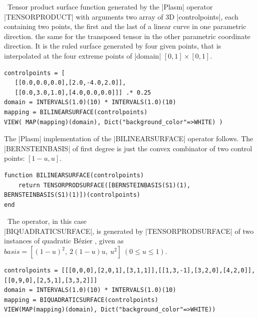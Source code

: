 \begin{coding}[Algebraic computation of FE = $\delta_1$]
\begin{condition}\
Tensor product surface function generated by the |Plasm| operator |TENSORPRODUCT| with arguments two array of 3D |controlpoints|, each containing two points, the first and the last of a linear curve in one parametric direction. the same for the transposed tensor in the other parametric coordinate direction. It is the ruled surface generated by four given points, that is interpolated at the four extreme points of |domain| $[0,1]\times[0,1]$. 

\begin{lstlisting}[language=JuliaLocal, style=julia, mathescape=true]
controlpoints = [
   [[0.0,0.0,0.0],[2.0,-4.0,2.0]],
   [[0.0,3.0,1.0],[4.0,0.0,0.0]]] .* 0.25
domain = INTERVALS(1.0)(10) * INTERVALS(1.0)(10)
mapping = BILINEARSURFACE(controlpoints)
VIEW( MAP(mapping)(domain), Dict("background_color"=>WHITE) )
\end{lstlisting}
The |Plasm| implementation of the |BILINEARSURFACE| operator follows. The
|BERNSTEINBASIS| of first degree is just the convex combinator of two control points: $[1-u, u]$.
\begin{lstlisting}[language=JuliaLocal, style=julia, mathescape=true]
function BILINEARSURFACE(controlpoints)
	return TENSORPRODSURFACE([BERNSTEINBASIS(S1)(1), BERNSTEINBASIS(S1)(1)])(controlpoints)
end
\end{lstlisting}
\end{condition}

\begin{condition}[Biquadratic surface]\
The operator, in this case\\ |BIQUADRATICSURFACE|, is generated by |TENSORPRODSURFACE| of two instances of  quadratic Bézier , given as 
$basis = [ (1-u)^{2},\ 2(1-u)u,\ u^{2} ]\ (0\leq u\leq 1).$

\begin{lstlisting}[language=JuliaLocal, style=julia, mathescape=true]
controlpoints = [[[0,0,0],[2,0,1],[3,1,1]],[[1,3,-1],[3,2,0],[4,2,0]],[[0,9,0],[2,5,1],[3,3,2]]]
domain = INTERVALS(1.0)(10) * INTERVALS(1.0)(10)
mapping = BIQUADRATICSURFACE(controlpoints)
VIEW(MAP(mapping)(domain), Dict("background_color"=>WHITE))
\end{lstlisting}
\end{condition}




\end{coding}
